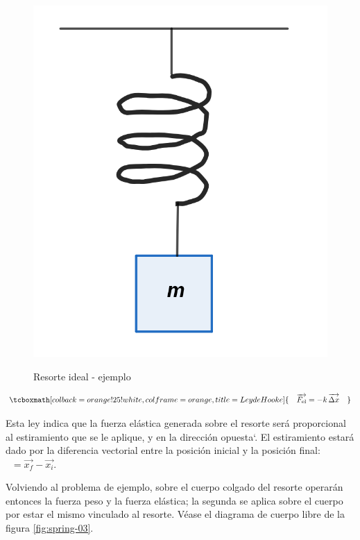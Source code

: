\documentclass{article}
\begin{document}
\begin{figure}[ht]
\centering
\caption{Resorte ideal - ejemplo}
\includegraphics[scale=0.8]{../../common/img/62.01/theory/15-dynamics-spring-02.png}
\label{fig:spring-02}
\end{figure}

\begin{equation}
\tcboxmath[colback=orange!25!white,colframe=orange,title=Ley de Hooke]{
\quad \overrightarrow{F_{\text{el}}} = -k \mathop{\overrightarrow{\Delta x}} \quad
}
\end{equation}

Esta ley indica que la fuerza elástica generada sobre el resorte será proporcional al estiramiento que se le aplique, y en la dirección opuesta`. El estiramiento estará dado por la diferencia vectorial entre la posición inicial y la posición final: $\mathop{\overrightarrow{\Delta x}} = \overrightarrow{x_f} - \overrightarrow{x_i}$.

Volviendo al problema de ejemplo, sobre el cuerpo colgado del resorte operarán entonces la fuerza peso y la fuerza elástica; la segunda se aplica sobre el cuerpo por estar el mismo vinculado al resorte. Véase el diagrama de cuerpo libre de la figura \ref{fig:spring-03}.
\end{document}
